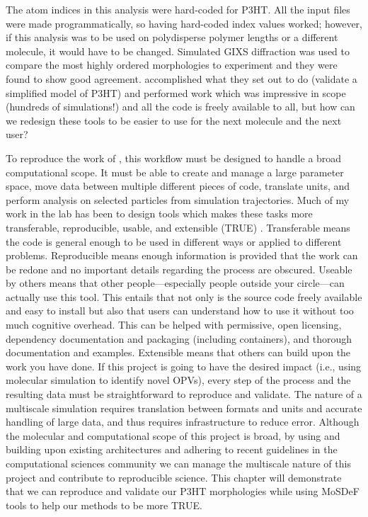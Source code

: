 The atom indices in this analysis were hard-coded for P3HT.
All the input files were made programmatically, so having hard-coded index values worked; however, if this analysis was to be used on polydisperse polymer lengths or a different molecule, it would have to be changed.
Simulated GIXS diffraction was used to compare the most highly ordered morphologies to experiment and they were found to show good agreement.
\citet{Miller2018} accomplished what they set out to do (validate a simplified model of P3HT) and performed work which was impressive in scope (hundreds of simulations!) and all the code is freely available to all, but how can we redesign these tools to be easier to use for the next molecule and the next user?

To reproduce the work of \citet{Miller2018}, this workflow must be designed to handle a broad computational scope.
It must be able to create and manage a large parameter space, move data between multiple different pieces of code, translate units, and perform analysis on selected particles from simulation trajectories.
Much of my work in the lab has been to design tools which makes these tasks more transferable, reproducible, usable, and extensible (TRUE) \citep{Thompson2020}.
Transferable means the code is general enough to be used in different ways or applied to different problems.
Reproducible means enough information is provided that the work can be redone and no important details regarding the process are obscured.
Useable by others means that other people---especially people outside your circle---can actually use this tool. This entails that not only is the source code freely available and easy to install but also that users can understand how to use it without too much cognitive overhead. This can be helped with permissive, open licensing, dependency documentation and packaging (including containers), and thorough documentation and examples.
Extensible means that others can build upon the work you have done.
If this project is going to have the desired impact (i.e., using molecular simulation to identify novel OPVs), every step of the process and the resulting data must be straightforward to reproduce and validate.
The nature of a multiscale simulation requires translation between formats and units and accurate handling of large data, and thus requires infrastructure to reduce error.
Although the molecular and computational scope of this project is broad, by using and building upon existing architectures and adhering to recent guidelines in the computational sciences community we can manage the multiscale nature of this project and contribute to reproducible science.
This chapter will demonstrate that we can reproduce and validate our P3HT morphologies while using MoSDeF tools to help our methods to be more TRUE.

